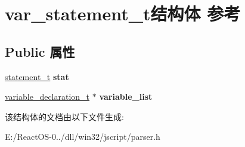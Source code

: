 \hypertarget{structvar__statement__t}{}\section{var\+\_\+statement\+\_\+t结构体 参考}
\label{structvar__statement__t}
\subsection*{Public 属性}
\begin{DoxyCompactItemize}
\item 
\mbox{\label{structvar__statement__t_a2ca87690b0ad910c29d5b9111e8ba1fd}} 
\hyperlink{struct__statement__t}{statement\+\_\+t} {\bfseries stat}
\item 
\mbox{\label{structvar__statement__t_a0f0d3c58e3460cffa86acc181f62ee1b}} 
\hyperlink{struct__variable__declaration__t}{variable\+\_\+declaration\+\_\+t} $\ast$ {\bfseries variable\+\_\+list}
\end{DoxyCompactItemize}


该结构体的文档由以下文件生成\+:\begin{DoxyCompactItemize}
\item 
E\+:/\+React\+O\+S-\/0../dll/win32/jscript/parser.\+h\end{DoxyCompactItemize}
